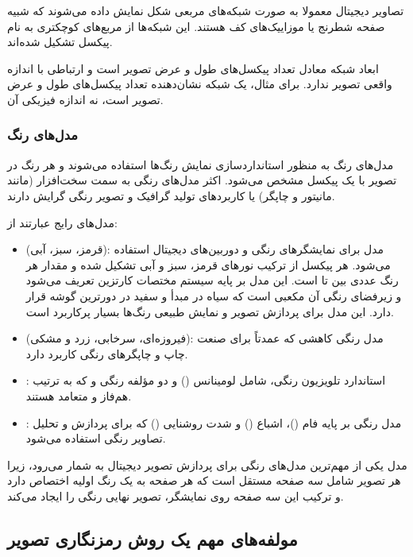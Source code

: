 تصاویر دیجیتال معمولا به صورت شبکه‌های مربعی شکل نمایش داده می‌شوند که شبیه صفحه شطرنج یا موزاییک‌های کف هستند. این شبکه‌ها از مربع‌های کوچکتری به نام پیکسل تشکیل شده‌اند.

ابعاد شبکه معادل تعداد پیکسل‌های طول و عرض تصویر است و ارتباطی با اندازه واقعی تصویر ندارد. برای مثال، یک شبکه  نشان‌دهنده تعداد پیکسل‌های طول و عرض تصویر است، نه اندازه فیزیکی آن\cite{ref42}.

\subsubsection{مدل‌های رنگ}

مدل‌های رنگ به منظور استانداردسازی نمایش رنگ‌ها استفاده می‌شوند و هر رنگ در تصویر با یک پیکسل مشخص می‌شود. اکثر مدل‌های رنگی به سمت سخت‌افزار (مانند مانیتور و چاپگر) یا کاربردهای تولید گرافیک و تصویر رنگی گرایش دارند\cite{ref43}.

مدل‌های رایج عبارتند از:

\begin{itemize}
    \item {} (قرمز، سبز، آبی): مدل  برای نمایشگرهای رنگی و دوربین‌های دیجیتال استفاده می‌شود. هر پیکسل از ترکیب نورهای قرمز، سبز و آبی تشکیل شده و مقدار هر رنگ عددی بین  تا  است. این مدل بر پایه سیستم مختصات کارتزین تعریف می‌شود و زیرفضای رنگی آن مکعبی است که سیاه در مبدأ و سفید در دورترین گوشه قرار دارد. این مدل برای پردازش تصویر و نمایش طبیعی رنگ‌ها بسیار پرکاربرد است.
    \item {} (فیروزه‌ای، سرخابی، زرد و مشکی): مدل رنگی کاهشی که عمدتاً برای صنعت چاپ و چاپگرهای رنگی کاربرد دارد.
    \item {}: استاندارد تلویزیون رنگی، شامل لومینانس () و دو مؤلفه رنگی  و  که به ترتیب هم‌فاز و متعامد هستند.
    \item {}: مدل رنگی بر پایه فام ()، اشباع () و شدت روشنایی () که برای پردازش و تحلیل تصاویر رنگی استفاده می‌شود.
\end{itemize}

مدل  یکی از مهم‌ترین مدل‌های رنگی برای پردازش تصویر دیجیتال به شمار می‌رود، زیرا هر تصویر شامل سه صفحه مستقل است که هر صفحه به یک رنگ اولیه اختصاص دارد و ترکیب این سه صفحه روی نمایشگر، تصویر نهایی رنگی را ایجاد می‌کند.

\subsection{مولفه‌های مهم یک روش رمزنگاری تصویر}

